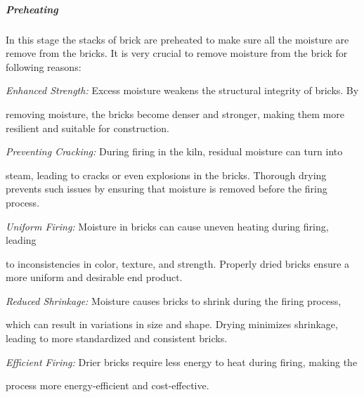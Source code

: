 \subparagraph{Preheating}
\begin{adjustwidth}{1.5em}{0em}
In this stage the stacks of brick are preheated to make sure all the moisture are remove from the bricks. It is very crucial to remove moisture from the brick for following reasons:

\vspace{0.1cm}
\textit{Enhanced Strength:}
 Excess moisture weakens the structural integrity of bricks. By \begin{adjustwidth}{1.5em}{0em}removing moisture, the bricks become denser and stronger, making them more resilient and suitable for construction.
 \vspace{0.1cm}
\end{adjustwidth}

\textit{Preventing Cracking:}
 During firing in the kiln, residual moisture can turn into \begin{adjustwidth}{1.5em}{0em}steam, leading to cracks or even explosions in the bricks. Thorough drying prevents such issues by ensuring that moisture is removed before the firing process.
\vspace{0.1cm}
\end{adjustwidth}

\textit{Uniform Firing:}
 Moisture in bricks can cause uneven heating during firing, leading \begin{adjustwidth}{1.5em}{0em}to inconsistencies in color, texture, and strength. Properly dried bricks ensure a more uniform and desirable end product.
 \vspace{0.1cm}
\end{adjustwidth}

\textit{Reduced Shrinkage:}
 Moisture causes bricks to shrink during the firing process, \begin{adjustwidth}{1.5em}{0em}which can result in variations in size and shape. Drying minimizes shrinkage, leading to more standardized and consistent bricks.
\vspace{0.1cm}
\end{adjustwidth}

\textit{Efficient Firing:} Drier bricks require less energy to heat during firing, making the \begin{adjustwidth}{1.5em}{0em}process more energy-efficient and cost-effective.
\vspace{0.1cm}
\end{adjustwidth}
\end{adjustwidth}
\vspace{0.1cm}

